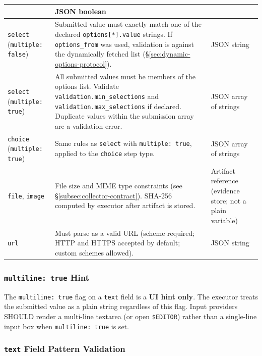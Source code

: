 \begin{center}
\begin{tabular}{|l|p{5.0cm}|p{3.6cm}|}
  & JSON boolean \\
\hline
\texttt{select}
(\texttt{multiple: false})
  & Submitted value must exactly match one of the declared
    \texttt{options[*].value} strings.  If \texttt{options\_from} was used,
    validation is against the dynamically fetched list (§\ref{sec:dynamic-options-protocol}).
  & JSON string \\
\hline
\texttt{select}
(\texttt{multiple: true})
  & All submitted values must be members of the options list.
    Validate \texttt{validation.min\_selections} and
    \texttt{validation.max\_selections} if declared.
    Duplicate values within the submission array are a validation error.
  & JSON array of strings \\
\hline
\texttt{choice}
(\texttt{multiple: true})
  & Same rules as \texttt{select} with \texttt{multiple: true}, applied to the
    \texttt{choice} step type.
  & JSON array of strings \\
\hline
\texttt{file},
\texttt{image}
  & File size and MIME type constraints (see §\ref{subsec:collector-contract}).
    SHA-256 computed by executor after artifact is stored.
  & Artifact reference (evidence store; not a plain variable) \\
\hline
\texttt{url}
  & Must parse as a valid URL (scheme required; HTTP and HTTPS accepted by
    default; custom schemes allowed).
  & JSON string \\
\hline
\end{tabular}
\end{center}

\subsubsection*{\texttt{multiline: true} Hint}

The \texttt{multiline: true} flag on a \texttt{text} field is a \textbf{UI hint only}.
The executor treats the submitted value as a plain string regardless of this flag.
Input providers SHOULD render a multi-line textarea (or open \texttt{\$EDITOR}) rather
than a single-line input box when \texttt{multiline: true} is set.

\subsubsection*{\texttt{text} Field Pattern Validation}


